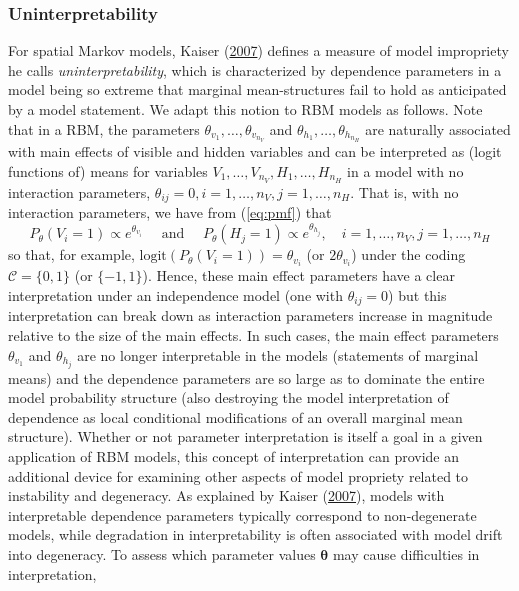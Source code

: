 \documentclass[12pt]{article}
\theoremstyle{definition}
\newcommand{\nv}{{n_{\scriptscriptstyle V}}}
\newcommand{\nh}{{n_{\scriptscriptstyle H}}}
\begin{document}
\subsubsection{Uninterpretability}\label{uninterpretability}

For spatial Markov models, Kaiser
(\protect\hyperlink{ref-kaiser2007statistical}{2007}) defines a measure
of model impropriety he calls \emph{uninterpretability}, which is
characterized by dependence parameters in a model being so extreme that
marginal mean-structures fail to hold as anticipated by a model
statement. We adapt this notion to RBM models as follows. Note that in a
RBM, the parameters \(\theta_{v_1}, \dots, \theta_{v_\nv}\) and
\(\theta_{h_1}, \dots, \theta_{h_\nh}\) are naturally associated with
main effects of visible and hidden variables and can be interpreted as
(logit functions of) means for variables
\(V_1, \dots, V_\nv, H_1, \dots, H_\nh\) in a model with no interaction
parameters, \(\theta_{ij} = 0, i = 1, \dots, \nv, j = 1, \dots, \nh\).
That is, with no interaction parameters, we have from (\eqref{eq:pmf})
that \[
P_\theta(V_i=1) \propto e^{\theta_{v_i}} \quad \text{ and } \quad P_\theta(H_j=1) \propto e^{\theta_{h_j}}, \quad  i=1,\ldots,\nv,j=1,\ldots,\nh
\] so that, for example, \(\text{logit}(P_\theta(V_i=1))=\theta_{v_i}\)
(or \(2 \theta_{v_i}\)) under the coding \(\mathcal{C}=\{0,1\}\) (or
\(\{-1,1\}\)). Hence, these main effect parameters have a clear
interpretation under an independence model (one with
\(\theta_{ij} = 0\)) but this interpretation can break down as
interaction parameters increase in magnitude relative to the size of the
main effects. In such cases, the main effect parameters \(\theta_{v_1}\)
and \(\theta_{h_j}\) are no longer interpretable in the models
(statements of marginal means) and the dependence parameters are so
large as to dominate the entire model probability structure (also
destroying the model interpretation of dependence as local conditional
modifications of an overall marginal mean structure). Whether or not
parameter interpretation is itself a goal in a given application of RBM
models, this concept of interpretation can provide an additional device
for examining other aspects of model propriety related to instability
and degeneracy. As explained by Kaiser
(\protect\hyperlink{ref-kaiser2007statistical}{2007}), models with
interpretable dependence parameters typically correspond to
non-degenerate models, while degradation in interpretability is often
associated with model drift into degeneracy. To assess which parameter
values \(\boldsymbol \theta\) may cause difficulties in interpretation,
\end{document}
